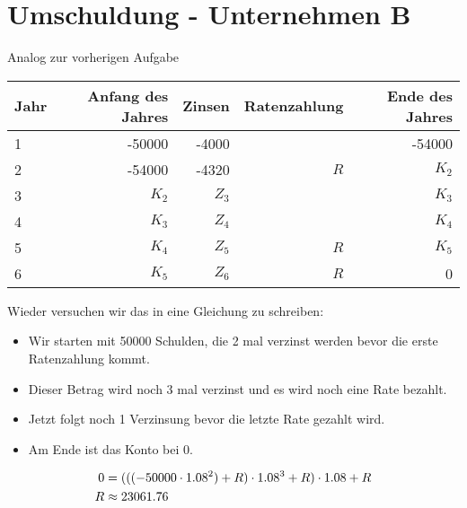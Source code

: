 \documentclass{article}
\begin{document}
	\section*{Umschuldung - Unternehmen B}
	Analog zur vorherigen Aufgabe
	\begin{center}
		\begin{tabular}{l|r|r|r|r}
			\textbf{Jahr} & \textbf{Anfang des Jahres} & \textbf{Zinsen} & \textbf{Ratenzahlung} & \textbf{Ende des Jahres} \\
			\hline
			1 & -50000 & -4000 & & -54000 \\
			2 & -54000 & -4320 & $R$ & $K_2$ \\
			3 & $K_2$ & $Z_3$ & & $K_3$ \\
			4 & $K_3$ & $Z_4$ & & $K_4$ \\
			5 & $K_4$ & $Z_5$ & $R$ & $K_5$ \\
			6 & $K_5$ & $Z_6$ & $R$ & 0
		\end{tabular}
	\end{center}
	Wieder versuchen wir das in eine Gleichung zu schreiben:
	\begin{itemize}
		\item Wir starten mit 50000 Schulden, die 2 mal verzinst werden bevor die erste Ratenzahlung kommt.
		\item Dieser Betrag wird noch 3 mal verzinst und es wird noch eine Rate bezahlt.
		\item Jetzt folgt noch 1 Verzinsung bevor die letzte Rate gezahlt wird.
		\item Am Ende ist das Konto bei 0.
	\end{itemize}
	\begin{align}
		0 &= (((-50000 \cdot 1.08^2) + R) \cdot 1.08^3 + R) \cdot 1.08 + R \notag \\
		R &\approx 23061.76 \notag
	\end{align}
	
\end{document}
